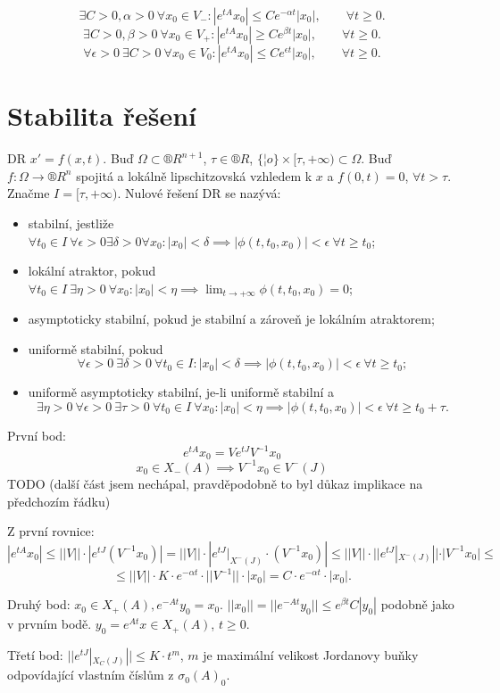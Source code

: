 \documentclass[12pt]{article}					%
\begin{document}
\begin{veta}
	$$ \exists C > 0, \alpha > 0\ \forall x_0 \in V_-: |e^{tA} x_0| ≤ C e^{-\alpha t}|x_0|, \qquad \forall t ≥ 0. $$
	$$ \exists C > 0, \beta > 0\ \forall x_0 \in V_+: |e^{tA} x_0| ≥ C e^{\beta t}|x_0|, \qquad \forall t ≥ 0. $$
	$$ \forall \epsilon > 0\ \exists C > 0\ \forall x_0 \in V_0: |e^{tA} x_0| ≤ C e^{\epsilon t}|x_0|, \qquad \forall t ≥ 0. $$
\end{veta}

\section{Stabilita řešení}
\begin{definice}
	DR $x' = f(x, t)$. Buď $\Omega \subset ®R^{n+1}$, $\tau \in ®R$, $\{¦o\} \times [\tau, +∞) \subset \Omega$. Buď $f: \Omega \rightarrow ®R^n$ spojitá a lokálně lipschitzovská vzhledem k $x$ a $f(0, t) = 0$, $\forall t > \tau$. Značme $I = [\tau, +∞)$. Nulové řešení DR se nazývá:

	\begin{itemize}
		\item stabilní, jestliže $\forall t_0 \in I\ \forall \epsilon > 0 \exists \delta > 0 \forall x_0: |x_0| < \delta \implies |\phi(t, t_0, x_0)| < \epsilon\ \forall t ≥ t_0$;
		\item lokální atraktor, pokud $\forall t_0 \in I\ \exists \eta > 0\ \forall x_0: |x_0| < \eta \implies \lim_{t \rightarrow +∞} \phi(t, t_0, x_0) = 0$;
		\item asymptoticky stabilní, pokud je stabilní a zároveň je lokálním atraktorem;
%
%
		\item uniformě stabilní, pokud
			$$ \forall \epsilon > 0\ \exists \delta > 0\ \forall t_0 \in I: |x_0| < \delta \implies |\phi(t, t_0, x_0)| < \epsilon\ \forall t ≥ t_0; $$
		\item uniformě asymptoticky stabilní, je-li uniformě stabilní a
			$$ \exists \eta > 0\ \forall \epsilon > 0\ \exists \tau > 0\ \forall t_0 \in I\ \forall x_0: |x_0| < \eta \implies |\phi(t, t_0, x_0)| < \epsilon\ \forall t ≥ t_0 + \tau. $$
	\end{itemize}
\end{definice}


\begin{dukaz}
	První bod:
	$$ e^{t A} x_0 = V e^{t J}V^{-1} x_0 $$
	$$ x_0 \in X_-(A) \implies V^{-1} x_0 \in V^-(J) $$
	TODO (další část jsem nechápal, pravděpodobně to byl důkaz implikace na předchozím řádku)

	Z první rovnice:
	$$ |e^{tA}x_0| ≤ ||V||·|e^{t J}(V^{-1} x_0)| = ||V||·\left|e^{t J}|_{X^-(J)}·(V^{-1}x_0)\right| ≤ ||V||·||e^{t J}|_{X^-(J)}||·|V^{-1}x_0| ≤ $$
	$$ ≤ ||V|| · K·e^{-\alpha t}·||V^{-1}||·|x_0| = C·e^{- \alpha t}·|x_0|. $$

	Druhý bod: $x_0 \in X_+(A), e^{-A t} y_0 = x_0$. $||x_0|| = ||e^{-At} y_0|| ≤ e^{\beta t} C |y_0|$ podobně jako v prvním bodě. $y_0 = e^{At}x \in X_+(A)$, $t ≥ 0$.
	
	Třetí bod: $||e^{tJ}|_{X_C(J)}|| ≤ K·t^m$, $m$ je maximální velikost Jordanovy buňky odpovídající vlastním číslům z $\sigma_0(A)_0$.
\end{dukaz}
\end{document}
